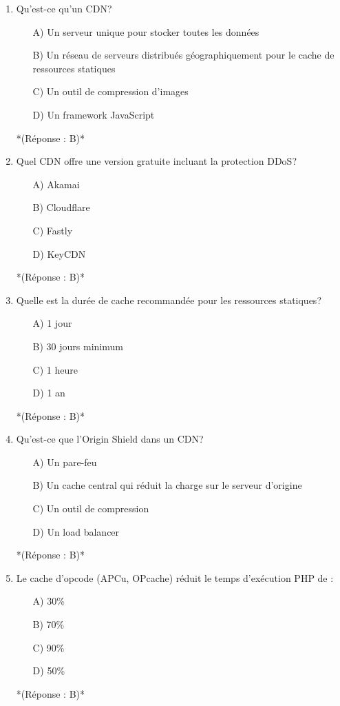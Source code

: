 \documentclass[12pt,a4paper,twoside]{report}
\begin{document}
\begin{enumerate}
\item Qu'est-ce qu'un CDN?
\begin{itemize}
\item[A)] Un serveur unique pour stocker toutes les données
\item[B)] Un réseau de serveurs distribués géographiquement pour le cache de ressources statiques
\item[C)] Un outil de compression d'images
\item[D)] Un framework JavaScript
\end{itemize}
*(Réponse : B)*

\item Quel CDN offre une version gratuite incluant la protection DDoS?
\begin{itemize}
\item[A)] Akamai
\item[B)] Cloudflare
\item[C)] Fastly
\item[D)] KeyCDN
\end{itemize}
*(Réponse : B)*

\item Quelle est la durée de cache recommandée pour les ressources statiques?
\begin{itemize}
\item[A)] 1 jour
\item[B)] 30 jours minimum
\item[C)] 1 heure
\item[D)] 1 an
\end{itemize}
*(Réponse : B)*

\item Qu'est-ce que l'Origin Shield dans un CDN?
\begin{itemize}
\item[A)] Un pare-feu
\item[B)] Un cache central qui réduit la charge sur le serveur d'origine
\item[C)] Un outil de compression
\item[D)] Un load balancer
\end{itemize}
*(Réponse : B)*

\item Le cache d'opcode (APCu, OPcache) réduit le temps d'exécution PHP de :
\begin{itemize}
\item[A)] 30\%
\item[B)] 70\%
\item[C)] 90\%
\item[D)] 50\%
\end{itemize}
*(Réponse : B)*


\end{enumerate}
\end{document}
